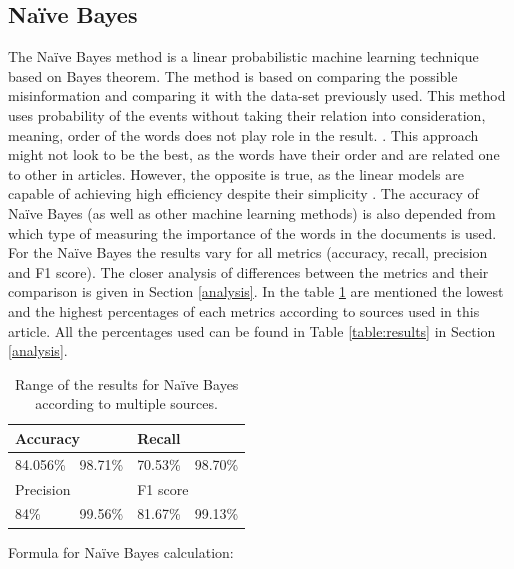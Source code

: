 \documentclass[11pt ,english,a4paper]{article}
\begin{document}
\subsection{Naïve Bayes}\label{nb}
The Naïve Bayes method is a linear probabilistic machine learning technique based on Bayes theorem. The method is based on comparing the possible misinformation and comparing it with the data-set previously used. This method uses probability of the events without taking their relation into consideration, meaning, order of the words does not play role in the result. \cite{sha20mach}. This approach might not look to be the best, as the words have their order and are related one to other in articles. However, the opposite is true, as the linear models are capable of achieving high efficiency despite their simplicity \cite{pod19mach}. The accuracy of Naïve Bayes (as well as other machine learning methods) is also depended from which type of measuring the importance of the words in the documents is used. For the Naïve Bayes the results vary for all metrics (accuracy, recall, precision and F1 score). The closer analysis of  differences between the metrics and their comparison is given in Section \ref{analysis}. In the table \ref{table:nb} are mentioned the lowest and the highest percentages of each metrics according to sources used in this article. All the percentages used can be found in Table \ref{table:results} in Section \ref{analysis}.

\begin{table}[H]
\centering
\begin{tabular}{|ll|ll|}
\hline
\multicolumn{2}{|l|}{Accuracy}           & \multicolumn{2}{l|}{Recall}      \\ \hline
\multicolumn{1}{|l|}{84.056\%\cite{sha20mach}} & 98.71\%\cite{bar21health} & \multicolumn{1}{l|}{70.53\%\cite{sha20mach}} & 98.70\%\cite{bar21health} \\ \hline
\multicolumn{2}{|l|}{Precision}      & \multicolumn{2}{l|}{F1 score}          \\ \hline
\multicolumn{1}{|l|}{84\%\cite{chap22unmask}} & 99.56\%\cite{bar21health} & \multicolumn{1}{l|}{81.67\%\cite{sha20mach}} & 99.13\%\cite{bar21health} \\ \hline
\end{tabular}
\caption{\centering Range of the results for Naïve Bayes according to multiple sources.}
\label{table:nb}
\end{table}


Formula for Naïve Bayes calculation: \cite{sha20mach}
\end{document}
